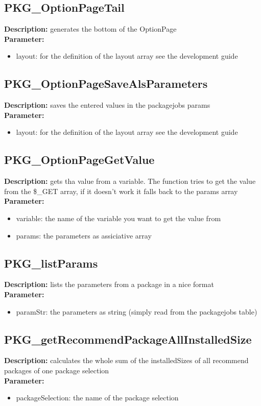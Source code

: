 \subsection{PKG\_OptionPageTail}
\textbf{Description:} generates the bottom of the OptionPage\\
\textbf{Parameter:}
\begin{itemize}
\item layout: for the definition of the layout array see the development guide
\end{itemize}

\subsection{PKG\_OptionPageSaveAlsParameters}
\textbf{Description:} saves the entered values in the packagejobs params\\
\textbf{Parameter:}
\begin{itemize}
\item layout: for the definition of the layout array see the development guide
\end{itemize}

\subsection{PKG\_OptionPageGetValue}
\textbf{Description:} gets tha value from a variable. The function tries to get the value from the \$\_GET array, if it doesn't work it falls back to the params array\\
\textbf{Parameter:}
\begin{itemize}
\item variable: the name of the variable you want to get the value from
\item params: the parameters as assiciative array
\end{itemize}

\subsection{PKG\_listParams}
\textbf{Description:} lists the parameters from a package in a nice format\\
\textbf{Parameter:}
\begin{itemize}
\item paramStr: the parameters as string (simply read from the packagejobs table)
\end{itemize}

\subsection{PKG\_getRecommendPackageAllInstalledSize}
\textbf{Description:} calculates the whole sum of the installedSizes of all recommend packages of one package selection\\
\textbf{Parameter:}
\begin{itemize}
\item packageSelection: the name of the package selection
\end{itemize}

